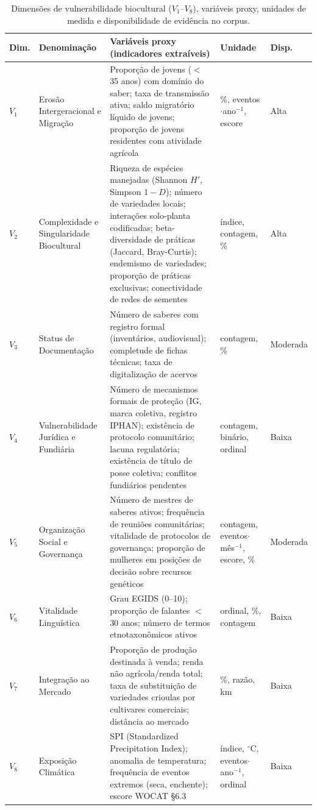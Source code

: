 \documentclass[12pt,a4paper]{article}
\begin{document}
\begin{table}[htbp]
\caption{Dimensões de vulnerabilidade biocultural ($V_1$--$V_8$), variáveis proxy, unidades de medida e disponibilidade de evidência no corpus.}
\label{tab:proxies}
\centering
\scriptsize
\begin{tabular}{p{0.7cm}p{2.2cm}p{4.0cm}p{2.0cm}p{1.3cm}}
\toprule
\textbf{Dim.} & \textbf{Denominação} & \textbf{Variáveis proxy (indicadores extraíveis)} & \textbf{Unidade} & \textbf{Disp.} \\
\midrule
$V_1$ & Erosão Intergeracional e Migração & Proporção de jovens ($<$ 35 anos) com domínio do saber; taxa de transmissão ativa; saldo migratório líquido de jovens; proporção de jovens residentes com atividade agrícola & \%, eventos$\cdot$ano$^{-1}$, escore & Alta \\
\addlinespace
$V_2$ & Complexidade e Singularidade Biocultural & Riqueza de espécies manejadas (Shannon $H'$, Simpson $1-D$); número de variedades locais; interações solo-planta codificadas; beta-diversidade de práticas (Jaccard, Bray-Curtis); endemismo de variedades; proporção de práticas exclusivas; conectividade de redes de sementes & índice, contagem, \% & Alta \\
\addlinespace
$V_3$ & Status de Documentação & Número de saberes com registro formal (inventários, audiovisual); completude de fichas técnicas; taxa de digitalização de acervos & contagem, \% & Moderada \\
\addlinespace
$V_4$ & Vulnerabilidade Jurídica e Fundiária & Número de mecanismos formais de proteção (IG, marca coletiva, registro IPHAN); existência de protocolo comunitário; lacuna regulatória; existência de título de posse coletiva; conflitos fundiários pendentes & contagem, binário, ordinal & Baixa \\
\addlinespace
$V_5$ & Organização Social e Governança & Número de mestres de saberes ativos; frequência de reuniões comunitárias; vitalidade de protocolos de governança; proporção de mulheres em posições de decisão sobre recursos genéticos & contagem, eventos$\cdot$mês$^{-1}$, escore, \% & Moderada \\
\addlinespace
$V_6$ & Vitalidade Linguística & Grau EGIDS (0--10); proporção de falantes $<$ 30 anos; número de termos etnotaxonômicos ativos & ordinal, \%, contagem & Baixa \\
\addlinespace
$V_7$ & Integração ao Mercado & Proporção de produção destinada à venda; renda não agrícola/renda total; taxa de substituição de variedades crioulas por cultivares comerciais; distância ao mercado & \%, razão, km & Baixa \\
\addlinespace
$V_8$ & Exposição Climática & SPI (Standardized Precipitation Index); anomalia de temperatura; frequência de eventos extremos (seca, enchente); escore WOCAT §6.3 & índice, $^\circ$C, eventos$\cdot$ano$^{-1}$, ordinal & Baixa \\
\bottomrule
\end{tabular}
\end{table}
\end{document}
